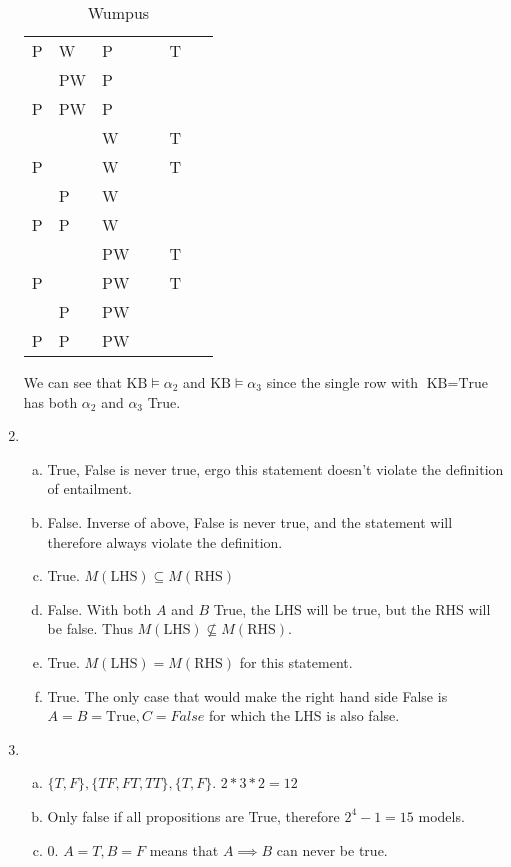 \begin{enumerate}
\begin{table}[h]
\begin{tabular}{l|l|l|l|l|l}
                P  & W  & P  & ~ & T & ~ \\
                ~  & PW & P  & ~ & ~ & ~ \\
                P  & PW & P  & ~ & ~ & ~ \\
                ~  & ~  & W  & ~ & T & ~ \\
                P  & ~  & W  & ~ & T & ~ \\
                ~  & P  & W  & ~ & ~ & ~ \\
                P  & P  & W  & ~ & ~ & ~ \\
                ~  & ~  & PW & ~ & T & ~ \\
                P  & ~  & PW & ~ & T & ~ \\
                ~  & P  & PW & ~ & ~ & ~ \\
                P  & P  & PW & ~ & ~ & ~ \\
            \end{tabular}
            \caption {Wumpus}
        \end{table}
        We can see that $\text{KB} \models \alpha_2$ and $\text{KB} \models \alpha_3$ since the single row with $\text{KB} = \text{True}$ has both $\alpha_2$ and $\alpha_3$ True.

    \item

        \begin{enumerate}[a.]
            \item True, False is never true, ergo this statement doesn't violate the definition of entailment.
            \item False. Inverse of above, False is never true, and the statement will therefore always violate the definition.
            \item True. $M(\text{LHS}) \subseteq M(\text{RHS})$
            \item False. With both $A$ and $B$ True, the LHS will be true, but the RHS will be false. Thus $M(\text{LHS}) \not\subseteq M(\text{RHS})$.
            \item True. $M(\text{LHS}) = M(\text{RHS})$ for this statement.
            \item True. The only case that would make the right hand side False is $A = B = \text{True}, C = False$ for which the LHS is also false.
        \end{enumerate}
    \item
        \begin{enumerate}[a.]
            \item $\{T, F\}, \{TF, FT, TT\}, \{T, F\}$. $2*3*2 = 12$
            \item Only false if all propositions are True, therefore $2^4 - 1 = 15$ models.
            \item $0$. $A = T, B = F$ means that $A \implies B$ can never be true.
        \end{enumerate}


\end{enumerate}
